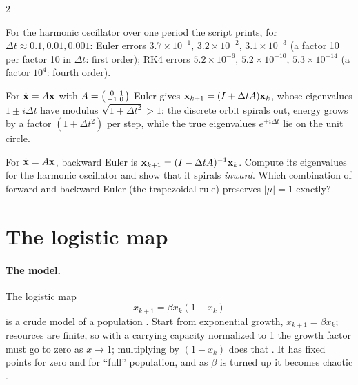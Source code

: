 \begin{paracol}{2}

For the harmonic oscillator over one period the script prints, for $\Delta t\approx0.1,0.01,0.001$:
Euler errors $3.7\times10^{-1}$, $3.2\times10^{-2}$, $3.1\times10^{-3}$ (a factor 10 per factor 10 in
$\Delta t$: first order); RK4 errors $5.2\times10^{-6}$, $5.2\times10^{-10}$, $5.3\times10^{-14}$ (a
factor $10^4$: fourth order).

\begin{example}
For $\dot{\mathbf{x}}=A\mathbf{x}$ with $A=\begin{psmallmatrix}0&1\\-1&0\end{psmallmatrix}$ Euler gives
$\mathbf{x}_{k+1}=(I+\Delta tA)\mathbf{x}_k$, whose eigenvalues $1\pm i\Delta t$ have modulus
$\sqrt{1+\Delta t^2}>1$: the discrete orbit spirals out, energy grows by a factor
$(1+\Delta t^2)$ per step, while the true eigenvalues $e^{\pm i\Delta t}$ lie on the unit circle.
\end{example}

\begin{exercise}
For $\dot{\mathbf{x}}=A\mathbf{x}$, backward Euler is $\mathbf{x}_{k+1}=(I-\Delta tA)^{-1}\mathbf{x}_k$. Compute its eigenvalues
for the harmonic oscillator and show that it spirals \emph{inward}. Which combination of forward and
backward Euler (the trapezoidal rule) preserves $|\mu|=1$ exactly?
\end{exercise}

\section{The logistic map}\label{sec:si-logistic}

\paragraph{The model.} The logistic map
\begin{equation}\label{eq:si-logistic}
  x_{k+1}=\beta x_k(1-x_k)
\end{equation}
is a crude model of a population . Start from exponential growth,
$x_{k+1}=\beta x_k$; resources are finite, so with a carrying capacity normalized to 1 the growth factor
must go to zero as $x\to1$; multiplying by $(1-x_k)$ does that . It has
fixed points for zero and for ``full'' population, and as $\beta$ is turned up it becomes chaotic
.


\end{paracol}
